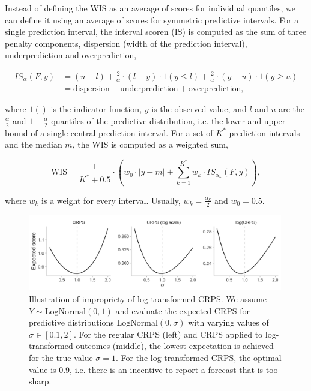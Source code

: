 \documentclass{article}
\begin{document}
Instead of defining the WIS as an average of scores for individual quantiles, we can define it using an average of scores for symmetric predictive intervals. For a single prediction interval, the interval scoren (IS) is computed as the sum of three penalty components, dispersion (width of the prediction interval), underprediction and overprediction,  
%
\begin{linenomath*}
\begin{align*}
 IS_\alpha(F,y) &= (u-l) + \frac{2}{\alpha} \cdot (l-y) \cdot 1(y \leq l) + \frac{2}{\alpha} \cdot (y-u) \cdot 1(y \geq u) \\
 &= \text{dispersion} + \text{underprediction} + \text{overprediction},    
\end{align*}
\end{linenomath*}
%
where $1()$ is the indicator function, $y$ is the observed value, and $l$ and $u$ are the $\frac{\alpha}{2}$ and $1 - \frac{\alpha}{2}$ quantiles of the predictive distribution, i.e. the lower and upper bound of a single central prediction interval. For a set of $K^*$ prediction intervals and the median $m$, the WIS is computed as a weighted sum, 
\begin{linenomath*}
\begin{equation*}
\text{WIS} = \frac{1}{K^* + 0.5} \cdot \left(w_0 \cdot |y - m| + \sum_{k = 1}^{K^*} w_k \cdot IS_{\alpha_{k}}(F, y)\right),    
\end{equation*} 
\end{linenomath*}
where $w_k$ is a weight for every interval. Usually, $w_k = \frac{\alpha_k}{2}$ and $w_0 = 0.5$. 

\begin{figure}[h!]
    \centering
    \includegraphics[width=0.99\textwidth]{output/figures/example-log-first.png}
    \caption{Illustration of impropriety of log-transformed CRPS. We assume $Y \sim \text{LogNormal}(0, 1)$ and evaluate the expected CRPS for predictive distributions $\text{LogNormal}(0, \sigma)$ with varying values of $\sigma \in [0.1, 2]$. For the regular CRPS (left) and CRPS applied to log-transformed outcomes (middle), the lowest expectation is achieved for the true value $\sigma = 1$. For the log-transformed CRPS, the optimal value is  0.9, i.e. there is an incentive to report a forecast that is too sharp.}
    \label{fig:log-improper}
\end{figure}
\end{document}
